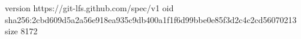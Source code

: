 version https://git-lfs.github.com/spec/v1
oid sha256:2cbd609d5a2a56e918ea935c9db400a1f1f6d99bbe0e85f3d2c4c2cd56070213
size 8172
